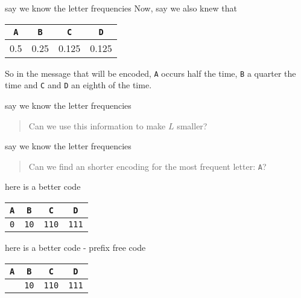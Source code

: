 \documentclass{beamer}
\newcommand{\cbla}{\color{black}}
\newcommand{\cred}{\color{red}}
\newcommand{\cgre}{\color{green}}
\newcommand{\sm}{\color{reddish}$}
\newcommand{\fm}{$\color{black}{}}
\newcommand{\letter}[1]{\color{blue}\texttt{#1}\color{black}}
\newcommand{\binary}[1]{\color{red}\texttt{#1}\color{black}}
\begin{document}
\begin{frame}{say we know the letter frequencies}
  Now, say we also knew that
  \begin{center}
\begin{tabular}{cccc}
\letter{A}&\letter{B}&\letter{C}&\letter{D}\\
\hline\cred
0.5&\cred 0.25&\cred 0.125&\cred 0.125
\cbla\end{tabular}
\end{center}
So in the message that will be encoded, \letter{A}{} occurs half the
time, \letter{B}{} a quarter the time and \letter{C}{} and \letter{D}{} an
eighth of the time.
\end{frame}



\begin{frame}{say we know the letter frequencies}

\begin{quote}
  \cred Can we use this information to make \sm L\fm\cred{} smaller?\cbla
  \end{quote}
\end{frame}


\begin{frame}{say we know the letter frequencies}

\begin{quote}
  \cred
  Can we find an shorter encoding for the most frequent letter: \letter{A}?\cbla
  \end{quote}
\end{frame}


\begin{frame}{here is a better code}
\begin{center}
\begin{tabular}{cccc}
\letter{A}&\letter{B}&\letter{C}&\letter{D}\\
\hline
\binary{0}&\binary{10}&\binary{110}&\binary{111}
\end{tabular}
\end{center}
\end{frame}  


\begin{frame}{here is a better code - prefix free code}
\begin{center}
\begin{tabular}{cccc}
\letter{A}&\letter{B}&\letter{C}&\letter{D}\\
\hline
\cgre{0}&\binary{10}&\binary{110}&\binary{111}
\end{tabular}
\end{center}
\end{frame}  
\end{document}

